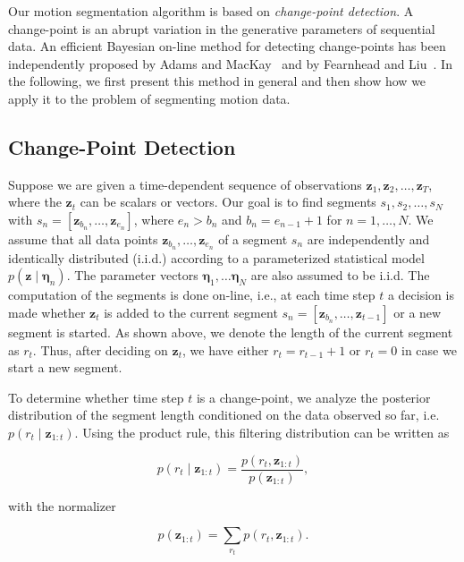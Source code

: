 Our motion segmentation algorithm is based on \emph{change-point detection}. A
change-point is an abrupt variation in the generative parameters of sequential
data. An efficient Bayesian on-line method for detecting change-points has been
independently proposed by Adams and MacKay~\cite{adams07bayesian} and by
Fearnhead and Liu~\cite{fearnhead07online}. In the following, we first present
this method in general and then show how we apply it to the problem of
segmenting motion data.

\subsection{Change-Point Detection}
Suppose we are given a time-dependent sequence of observations $\mathbf{z}_1,
\mathbf{z}_2, \dots,\mathbf{z}_T$, where the $\mathbf{z}_t$ can be scalars or
vectors. Our goal is to find segments $s_1,s_2,\dots,s_N$ with
$s_n=[\mathbf{z}_{b_n},\dots,\mathbf{z}_{e_n}]$, where $e_n > b_n$ and
$b_n = e_{n-1}+1$ for $n=1,\dots,N$. We assume that all data points
$\mathbf{z}_{b_n},\dots,\mathbf{z}_{e_n}$ of a segment $s_n$ are independently
and identically distributed (i.i.d.) according to a parameterized statistical
model \mbox{$p(\mathbf{z}\mid \boldsymbol{\eta}_n)$}. The parameter vectors
$\boldsymbol{\eta}_1,\dots \boldsymbol{\eta}_N$ are also assumed to be i.i.d.
The computation of the segments is done on-line, i.e., at each time step $t$ a
decision is made whether $\mathbf{z}_t$ is added to the current segment
$s_n=[\mathbf{z}_{b_n},\dots,\mathbf{z}_{t-1}]$ or a new segment is started. As
shown above, we denote the length of the current segment as $r_t$. Thus, after
deciding on $\mathbf{z}_t$, we have either $r_t=r_{t-1}+1$ or $r_t=0$ in case we
start a new segment.

To determine whether time step $t$ is a change-point, we analyze the posterior
distribution of the segment length conditioned on the data observed so far,
i.e. $p(r_t\mid \mathbf{z}_{1:t})$. Using the product rule, this filtering
distribution can be written as

\begin{equation}
\label{eqn:posterior}
p(r_t\mid \mathbf{z}_{1:t})=
  \frac{p(r_t,\mathbf{z}_{1:t})}{p(\mathbf{z}_{1:t})},
\end{equation}

with the normalizer

\begin{equation}
\label{eqn:normalizer}
p(\mathbf{z}_{1:t}) = \sum_{r_t}p(r_t,\mathbf{z}_{1:t}).
\end{equation}

